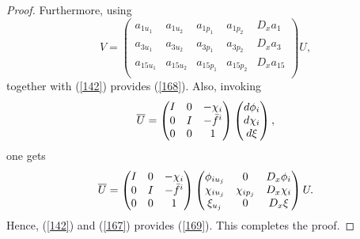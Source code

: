 \documentclass[10pt,a4paper]{amsart}
\begin{document}
\begin{proof}
 Furthermore, using 
\begin{equation}
V=\begin{pmatrix}
a_{1u_1}&a_{1u_2}&a_{1p_1}&a_{1p_2}&D_xa_1\\
a_{3u_1}&a_{3u_2}&a_{3p_1}&a_{3p_2}&D_xa_3\\
a_{15u_1}&a_{15u_2}&a_{15p_1}&a_{15p_2}&D_xa_{15}\\
\end{pmatrix}U,
\end{equation}
together with (\ref{142}) provides (\ref{168}). 
Also, invoking
\begin{equation}
\overline{\vphantom{x}U}=\begin{pmatrix}
I&\textbf{0}&-\chi_i\\
\textbf{0}&I&-\bar{f}^i\\
\textbf{0}&\textbf{0}&1\\
\end{pmatrix}\begin{pmatrix}
d\phi_i\\
d\chi_i\\
d\xi
\end{pmatrix},
\end{equation}
one gets
\begin{equation}\label{167}
\overline{\vphantom{x}U}=\begin{pmatrix}
I&\textbf{0}&-\chi_i\\
\textbf{0}&I&-\bar{f}^i\\
\textbf{0}&\textbf{0}&1\\
\end{pmatrix}\begin{pmatrix}
\phi_{iu_j}&\textbf{0}&D_x\phi_i\\
\chi_{iu_j}&\chi_{ip_j}&D_x\chi_i\\
\xi_{u_j}&\textbf{0}&D_x\xi
\end{pmatrix}U.
\end{equation}
Hence, (\ref{142}) and (\ref{167}) provides (\ref{169}). 
This completes the proof.
\end{proof}
\end{document}
